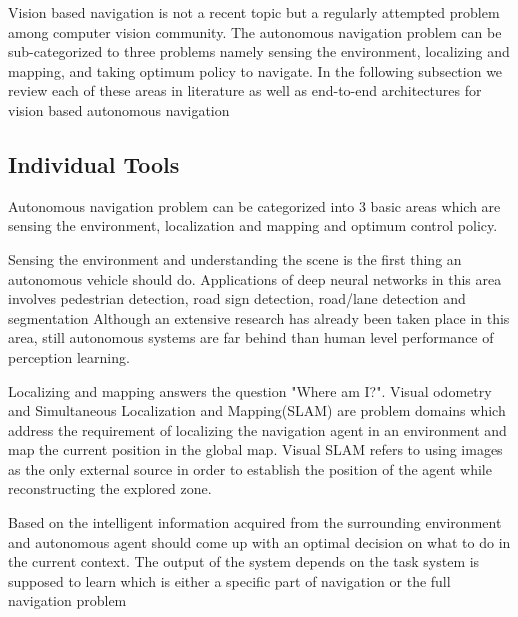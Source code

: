 Vision based navigation is not a recent topic but a regularly attempted problem among computer vision community. The autonomous navigation problem can be sub-categorized to three problems namely sensing the environment, localizing and mapping, and taking optimum policy to navigate. In the following subsection we review each of these areas in literature as well as end-to-end architectures for vision based autonomous navigation

\subsection{Individual Tools}

Autonomous navigation problem can be categorized into 3 basic areas which are sensing the environment, localization and mapping and optimum control policy.

Sensing the environment and understanding the scene is the first thing an autonomous vehicle should do. Applications of deep neural networks in this area involves pedestrian detection\cite{dollar2012pedestrian,oren1997pedestrian}, road sign detection\cite{maldonado2007road,fang2003road}, road/lane detection\cite{he2004color, kong2010general,bertozzi1998gold,wang2004lane,kim2017end} and segmentation \cite{long2015fully,badrinarayanan2015segnet,chen2018deeplab} Although an extensive research has already been taken place in this area, still autonomous systems are far behind than human level performance of perception learning. 

Localizing and mapping answers the question "Where am I?". Visual odometry\cite{nister2004visual} and Simultaneous Localization and Mapping(SLAM)\cite{thrun2007simultaneous, durrant2006simultaneous, bailey2006simultaneous} are problem domains which address the requirement of localizing the navigation agent in an environment and map the current position in the global map. Visual SLAM \cite{fuentes2015visual} refers to using images as the only external source in order to establish the position of the agent while reconstructing the explored zone.

Based on the intelligent information acquired from the surrounding environment and autonomous agent should come up with an optimal decision on what to do in the current context. The output of the system depends on the task system is supposed to learn which is either a specific part of navigation \cite{wang2001trajectory, rausch2017learning,bojarski2017explaining} or the full navigation problem \cite{xu2016end,bojarski2016end}

